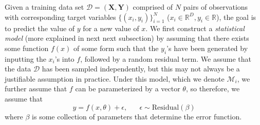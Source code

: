\documentclass{article}
\begin{document}
    Given a training data set $\mathcal{D} = (\mathbf{X}, \mathbf{Y})$ comprised of $N$ pairs of observations with corresponding target variables $\{(x_i, y_i)\}_{i=1}^N$ ($x_i \in \mathbb{R}^D, y_i \in \mathbb{R}$), the goal is to predict the value of $y$ for a new value of $x$. We first construct a \textit{statistical model} (more explained in next next subsection) by assuming that there exists some function $f(x)$ of some form such that the $y_i$'s have been generated by inputting the $x_i$'s into $f$, followed by a random residual term. We assume that the data $\mathcal{D}$ has been sampled independently, but this may not always be a justifiable assumption in practice. Under this model, which we denote $\mathcal{M}_i$, we further assume that $f$ can be parameterized by a vector $\theta$, so therefore, we assume that
    \begin{equation}
      y = f(x, \theta) + \epsilon, \;\;\;\;\;\; \epsilon \sim \text{Residual} (\beta)
    \end{equation}
    where $\beta$ is some collection of parameters that determine the error function.
\end{document}
